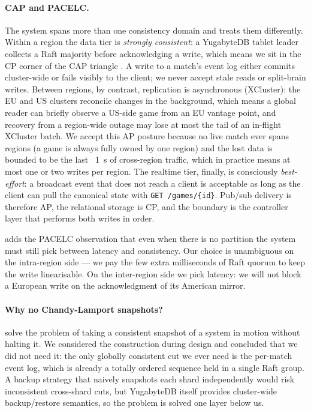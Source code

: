 \documentclass{scrartcl}
\begin{document}
\paragraph{CAP and PACELC.} The system spans more than one consistency
domain and treats them differently. Within a region the data tier is
\emph{strongly consistent}: a YugabyteDB tablet leader collects a Raft
majority before acknowledging a write, which means we sit in the CP
corner of the CAP triangle \citep{brewer2000towards, gilbert2002cap}. A
write to a match's event log either commits cluster-wide or fails
visibly to the client; we never accept stale reads or split-brain
writes. Between regions, by contrast, replication is asynchronous
(XCluster): the EU and US clusters reconcile changes in the background,
which means a global reader can briefly observe a US-side game from an
EU vantage point, and recovery from a region-wide outage may lose at
most the tail of an in-flight XCluster batch. We accept this AP
posture because no live match ever spans regions (a game is always
fully owned by one region) and the lost data is bounded to be the last
~1~s of cross-region traffic, which in practice means at most one or
two writes per region. The realtime tier, finally, is consciously
\emph{best-effort}: a broadcast event that does not reach a client is
acceptable as long as the client can pull the canonical state with
\texttt{GET /games/\{id\}}. Pub/sub delivery is therefore AP, the
relational storage is CP, and the boundary is the controller layer
that performs both writes in order.

\citet{abadi2012consistency} adds the PACELC observation that even when
there is no partition the system must still pick between latency and
consistency. Our choice is unambiguous on the intra-region side --- we
pay the few extra milliseconds of Raft quorum to keep the write linearisable.
On the inter-region side we pick latency: we will not block a
European write on the acknowledgment of its American mirror.

\paragraph{Why no Chandy-Lamport snapshots?} \citet{chandy1985distributed}
solve the problem of taking a consistent snapshot of a system in motion
without halting it. We considered the construction during design and
concluded that we did not need it: the only globally consistent cut we
ever need is the per-match event log, which is already a totally
ordered sequence held in a single Raft group. A backup strategy that
naively snapshots each shard independently would risk inconsistent
cross-shard cuts, but YugabyteDB itself provides cluster-wide
backup/restore semantics, so the problem is solved one layer below us.
\end{document}
